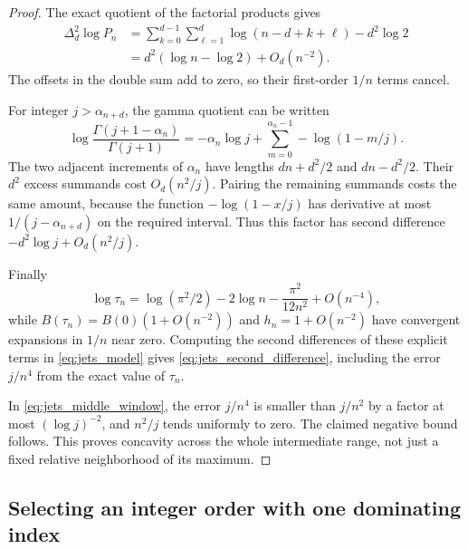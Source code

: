\documentclass[11pt]{article}
\numberwithin{equation}{section}
\theoremstyle{definition}
\begin{document}
\begin{proof}
The exact quotient of the factorial products gives
\begin{align*}
 \Delta_d^2\log P_n
 &=\sum_{k=0}^{d-1}\sum_{\ell=1}^d
       \log(n-d+k+\ell)-d^2\log2\\
 &=d^2(\log n-\log2)+O_d(n^{-2}).
\end{align*}
The offsets in the double sum add to zero, so their first-order
$1/n$ terms cancel.

For integer $j>\alpha_{n+d}$, the gamma quotient can be written
\[
 \log\frac{\Gamma(j+1-\alpha_n)}{\Gamma(j+1)}
 =-\alpha_n\log j+
   \sum_{m=0}^{\alpha_n-1}-\log(1-m/j).
\]
The two adjacent increments of $\alpha_n$ have lengths
$dn+d^2/2$ and $dn-d^2/2$. Their $d^2$ excess summands cost
$O_d(n^2/j)$. Pairing the remaining summands costs the same amount,
because the function $-\log(1-x/j)$ has derivative at most
$1/(j-\alpha_{n+d})$ on the required interval. Thus this factor has
second difference $-d^2\log j+O_d(n^2/j)$.

Finally
\[
 \log\tau_n=\log(\pi^2/2)-2\log n
             -\frac{\pi^2}{12n^2}+O(n^{-4}),
\]
while $B(\tau_n)=B(0)(1+O(n^{-2}))$ and $h_n=1+O(n^{-2})$
have convergent expansions in $1/n$ near zero. Computing the
second differences of these explicit terms in
\eqref{eq:jets_model} gives
\eqref{eq:jets_second_difference}, including the error $j/n^4$
from the exact value of $\tau_n$.

In \eqref{eq:jets_middle_window}, the error $j/n^4$ is smaller than
$j/n^2$ by a factor at most $(\log j)^{-2}$, and $n^2/j$ tends
uniformly to zero. The claimed negative bound follows. This proves
concavity across the whole intermediate range, not just a fixed
relative neighborhood of its maximum.
\end{proof}

\subsection{Selecting an integer order with one dominating index}
\end{document}
